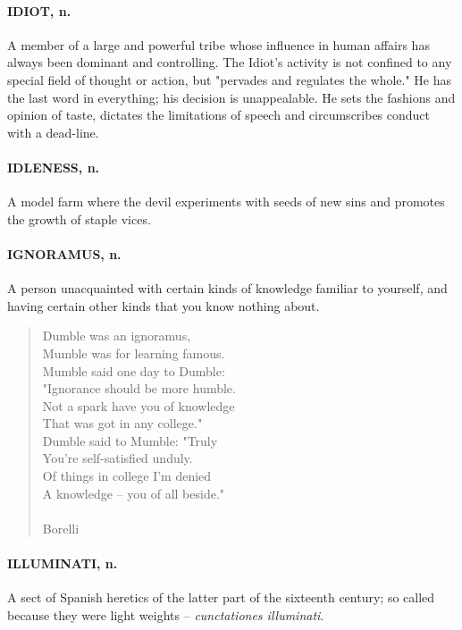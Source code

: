 \documentclass[11pt]{article}
\begin{document}
\paragraph{IDIOT, n.}  A member of a large and powerful tribe whose influence in
human affairs has always been dominant and controlling.  The Idiot's
activity is not confined to any special field of thought or action,
but "pervades and regulates the whole."  He has the last word in
everything; his decision is unappealable.  He sets the fashions and
opinion of taste, dictates the limitations of speech and circumscribes
conduct with a dead-line.

\paragraph{IDLENESS, n.}  A model farm where the devil experiments with seeds of
new sins and promotes the growth of staple vices.

\paragraph{IGNORAMUS, n.}  A person unacquainted with certain kinds of knowledge
familiar to yourself, and having certain other kinds that you know
nothing about.

\begin{quote}   Dumble was an ignoramus, \\
  Mumble was for learning famous. \\
  Mumble said one day to Dumble: \\
  "Ignorance should be more humble. \\
  Not a spark have you of knowledge \\
  That was got in any college." \\
  Dumble said to Mumble:  "Truly \\
  You're self-satisfied unduly. \\
  Of things in college I'm denied \\
  A knowledge -- you of all beside." \\
 \\
Borelli \end{quote}


\paragraph{ILLUMINATI, n.}  A sect of Spanish heretics of the latter part of the
sixteenth century; so called because they were light weights --
{\em cunctationes illuminati}.
\end{document}
